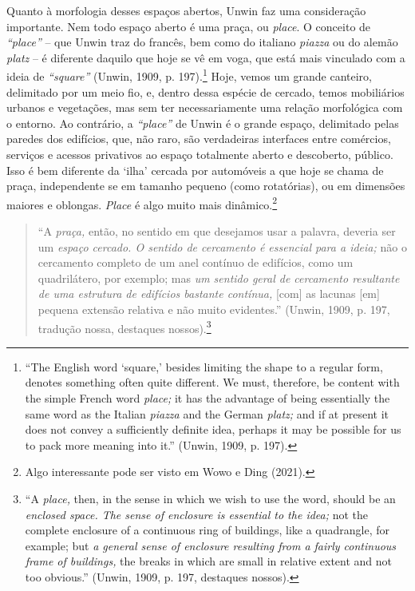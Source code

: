 \documentclass[12pt, a4paper]{book} %
\begin{document}
        Quanto à morfologia desses espaços abertos, Unwin faz uma consideração importante. Nem todo espaço aberto é uma praça, ou \textit{place}. O conceito de \textit{``place''}  – que Unwin traz do francês, bem como do italiano \textit{piazza} ou do alemão \textit{platz} – é diferente daquilo que hoje se vê em voga, que está mais vinculado com a ideia de \textit{``square''} (Unwin, 1909, p. 197).\footnote[69]{``The English word `square,' besides limiting the shape to a regular form, denotes something often quite different. We must, therefore, be content with the simple French word \textit{place;} it has the advantage of being essentially the same word as the Italian \textit{piazza} and the German \textit{platz;} and if at present it does not convey a sufficiently definite idea, perhaps it may be possible for us to pack more meaning into it.'' (Unwin, 1909, p. 197).} Hoje, vemos um grande canteiro, delimitado por um meio fio, e, dentro dessa espécie de cercado, temos mobiliários urbanos e vegetações, mas sem ter necessariamente uma relação morfológica com o entorno. Ao contrário, a \textit{``place''} de Unwin é o grande espaço, delimitado pelas paredes dos edifícios, que, não raro, são verdadeiras interfaces entre comércios, serviços e acessos privativos ao espaço totalmente aberto e descoberto, público. Isso é bem diferente da `ilha' cercada por automóveis a que hoje se chama de praça, independente se em tamanho pequeno (como rotatórias), ou em dimensões maiores e oblongas. \textit{Place} é algo muito mais dinâmico.\footnote[70]{Algo interessante pode ser visto em Wowo e Ding (2021).}

        \begin{quotation}
            ``A \textit{praça,} então, no sentido em que desejamos usar a palavra, deveria ser um \textit{espaço cercado. O sentido de cercamento é essencial para a ideia;} não o cercamento completo de um anel contínuo de edifícios, como um quadrilátero, por exemplo; mas \textit{um sentido geral de cercamento resultante de uma estrutura de edifícios bastante contínua,} [com] as lacunas [em] pequena extensão relativa e não muito evidentes.'' (Unwin, 1909, p. 197, tradução nossa, destaques nossos).\footnote[71]{``A \textit{place,} then, in the sense in which we wish to use the word, should be an \textit{enclosed space. The sense of enclosure is essential to the idea;} not the complete enclosure of a continuous ring of buildings, like a quadrangle, for example; but \textit{a general sense of enclosure resulting from a fairly continuous frame of buildings,} the breaks in which are small in relative extent and not too obvious.'' (Unwin, 1909, p. 197, destaques nossos).}
        \end{quotation}
\end{document}
